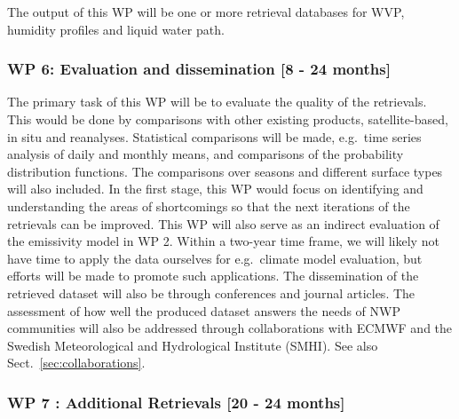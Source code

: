 \documentclass[12pt,oneside,a4paper]{article}
\begin{document}
The output of this WP will be one or more retrieval databases for WVP, humidity
profiles and liquid water path.
\vspace{-1.0ex}

\subsubsection*{WP 6: Evaluation and dissemination [8 - 24 months]}
%
\label{sec:evaluation}
The primary task of this WP will be to evaluate the quality of the retrievals.
This would be done by comparisons with other existing products,
satellite-based, in situ and reanalyses. Statistical comparisons will be made,
e.g.\, time series analysis of daily and monthly means, and comparisons of the
probability distribution functions. The comparisons over seasons and different
surface types will also included. In the first stage, this WP would focus on
identifying and understanding the areas of shortcomings so that the next
iterations of the retrievals can be improved. This WP will also serve as an
indirect evaluation of the emissivity model in WP 2. Within a two-year time
frame, we will likely not have time to apply the data ourselves for e.g.\
climate model evaluation, but efforts will be made to promote such applications.
The dissemination of the retrieved dataset will also be through conferences and
journal articles. The assessment of how well the produced dataset answers the
needs of NWP communities will also be addressed through collaborations with
ECMWF and the Swedish Meteorological and Hydrological Institute (SMHI). See
also Sect.~\ref{sec:collaborations}.
\vspace{-1.0ex}
\subsubsection*{WP 7 : Additional Retrievals [20 - 24 months]}
%
\label{sec:other_retrievals}
\end{document}

